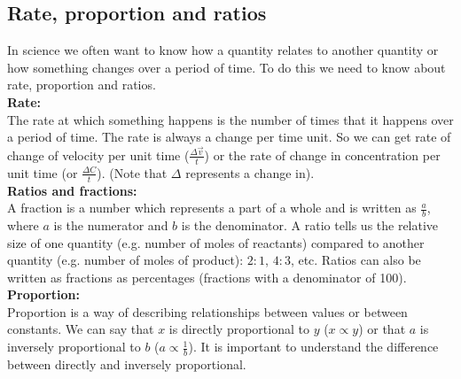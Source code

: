 \subsection*{Rate, proportion and ratios}
In science we often want to know how a quantity relates to another quantity or how something changes over a period of time. To do this we need to know about rate, proportion and ratios. \\
\textbf{Rate:}\\
The rate at which something happens is the number of times that it happens over a period of time. The rate is always a change per time unit. So we can get rate of change of velocity per unit time ($\frac{\Delta \vec{v}}{t}$) or the rate of change in concentration per unit time (or $\frac{\Delta{C}}{t}$). (Note that $\Delta$ represents a change in). \\
\textbf{Ratios and fractions:}\\
A fraction is a number which represents a part of a whole and is written as $\frac{a}{b}$, where $a$ is the numerator and $b$ is the denominator. A ratio tells us the relative size of one quantity (e.g.\@{} number of moles of reactants) compared to another quantity (e.g.\@{} number of moles of product): $2:1$, $4:3$, etc. Ratios can also be written as fractions as percentages (fractions with a denominator of 100). \\
\textbf{Proportion:}\\
Proportion is a way of describing relationships between values or between constants. We can say that $x$ is directly proportional to $y$ ($x \propto y$) or that $a$ is inversely proportional to $b$ ($a \propto \frac{1}{b}$). It is important to understand the difference between directly and inversely proportional.
